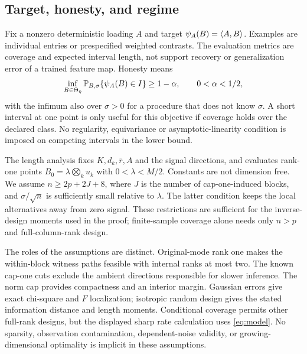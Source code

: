 \subsection{Target, honesty, and regime}
Fix a nonzero deterministic loading $A$ and target $\psi_A(B)=\langle A,B\rangle$. Examples are individual entries or prespecified weighted contrasts. The evaluation metrics are coverage and expected interval length, not support recovery or generalization error of a trained feature map. Honesty means
\[
 \inf_{B\in\Theta_\eta}\mathbb P_{B,\sigma}\{\psi_A(B)\in I\}\ge1-\alpha,
 \qquad 0<\alpha<1/2,
\]
with the infimum also over $\sigma>0$ for a procedure that does not know $\sigma$. A short interval at one point is only useful for this objective if coverage holds over the declared class. No regularity, equivariance or asymptotic-linearity condition is imposed on competing intervals in the lower bound.

The length analysis fixes $K,d_k,\bar r,A$ and the signal directions, and evaluates rank-one points $B_0=\lambda\bigotimes_ku_k$ with $0<\lambda<M/2$. Constants are not dimension free. We assume $n\ge2p+2J+8$, where $J$ is the number of cap-one-induced blocks, and $\sigma/\sqrt n$ is sufficiently small relative to $\lambda$. The latter condition keeps the local alternatives away from zero signal. These restrictions are sufficient for the inverse-design moments used in the proof; finite-sample coverage alone needs only $n>p$ and full-column-rank design.

The roles of the assumptions are distinct. Original-mode rank one makes the within-block witness paths feasible with internal ranks at most two. The known cap-one cuts exclude the ambient directions responsible for slower inference. The norm cap provides compactness and an interior margin. Gaussian errors give exact chi-square and $F$ localization; isotropic random design gives the stated information distance and length moments. Conditional coverage permits other full-rank designs, but the displayed sharp rate calculation uses \eqref{eq:model}. No sparsity, observation contamination, dependent-noise validity, or growing-dimensional optimality is implicit in these assumptions.
